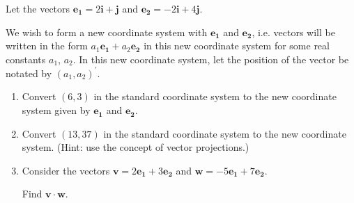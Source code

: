 \documentclass[11pt, a4paper, oneside]{exam}
\theoremstyle{definition}\newtheorem{define}{Definition}[section]
\theoremstyle{remark}\newtheorem{remark}{Remark}
\theoremstyle{definition}\newtheorem{example}{Example}[subsection]
\theoremstyle{definition}\newtheorem{notation}{Notation}[section]
\theoremstyle{definition}\newtheorem{theorem}{Theorem}[section]
\theoremstyle{definition}\newtheorem{corollary}{Corollary}[section]
\begin{document}
\begin{enumerate}
Let the vectors $\mathbf{e_1} = 2\mathbf{i} + \mathbf{j}$ and $\mathbf{e_2} = -2\mathbf{i} + 4\mathbf{j}$.

We wish to form a new coordinate system with $\mathbf{e_1}$ and $\mathbf{e_2}$, i.e. vectors will be written in the form $a_1\mathbf{e_1} + a_2\mathbf{e_2}$ in this new coordinate system for some real constants $a_1$, $a_2$. In this new coordinate system, let the position of the vector be notated by $(a_1, a_2)^\prime$.

\begin{enumerate}
  \item Convert $(6,3)$ in the standard coordinate system to the new coordinate system given by $\mathbf{e_1}$ and $\mathbf{e_2}$.
  \item Convert $(13,37)$ in the standard coordinate system to the new coordinate system. (Hint: use the concept of vector projections.)
  \item Consider the vectors $\mathbf{v} = 2\mathbf{e_1} + 3\mathbf{e_2}$ and $\mathbf{w} = -5\mathbf{e_1} + 7\mathbf{e_2}$.

  Find $\mathbf{v}\cdot \mathbf{w}$.
\end{enumerate}





\end{enumerate}


\end{document}
